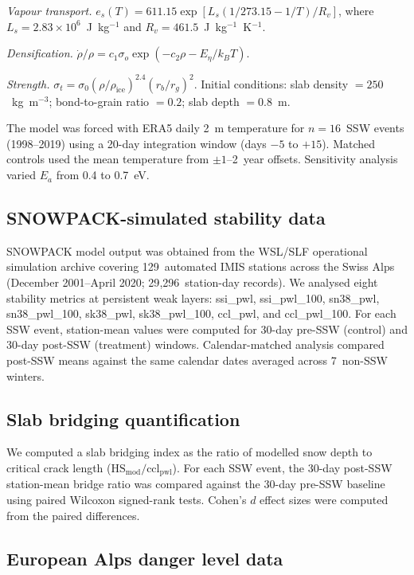 \documentclass[11pt,letterpaper]{article}
\begin{document}
\textit{Vapour transport.} $e_s(T) = 611.15 \exp[L_s (1/273.15 - 1/T) / R_v]$, where $L_s = 2.83 \times 10^6$~J~kg$^{-1}$ and $R_v = 461.5$~J~kg$^{-1}$~K$^{-1}$.

\textit{Densification.} $\dot{\rho}/\rho = c_1 \sigma_o \exp(-c_2 \rho - E_\eta / k_B T)$.

\textit{Strength.} $\sigma_t = \sigma_0 (\rho / \rho_{\text{ice}})^{2.4} (r_b / r_g)^2$. Initial conditions: slab density $= 250$~kg~m$^{-3}$; bond-to-grain ratio $= 0.2$; slab depth $= 0.8$~m.

The model was forced with ERA5 daily 2~m temperature for $n = 16$~SSW events (1998--2019) using a 20-day integration window (days $-5$ to $+15$). Matched controls used the mean temperature from $\pm 1$--2~year offsets. Sensitivity analysis varied $E_a$ from 0.4 to 0.7~eV.

\subsection{SNOWPACK-simulated stability data}

SNOWPACK model output was obtained from the WSL/SLF operational simulation archive covering 129~automated IMIS stations across the Swiss Alps (December 2001--April 2020; 29{,}296~station-day records). We analysed eight stability metrics at persistent weak layers: ssi\_pwl, ssi\_pwl\_100, sn38\_pwl, sn38\_pwl\_100, sk38\_pwl, sk38\_pwl\_100, ccl\_pwl, and ccl\_pwl\_100. For each SSW event, station-mean values were computed for 30-day pre-SSW (control) and 30-day post-SSW (treatment) windows. Calendar-matched analysis compared post-SSW means against the same calendar dates averaged across 7~non-SSW winters.

\subsection{Slab bridging quantification}

We computed a slab bridging index as the ratio of modelled snow depth to critical crack length ($\mathrm{HS_{mod}} / \mathrm{ccl_{pwl}}$). For each SSW event, the 30-day post-SSW station-mean bridge ratio was compared against the 30-day pre-SSW baseline using paired Wilcoxon signed-rank tests. Cohen's $d$ effect sizes were computed from the paired differences.

\subsection{European Alps danger level data}
\end{document}
